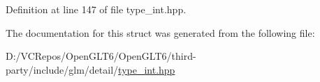 Definition at line 147 of file type\+\_\+int.\+hpp.



The documentation for this struct was generated from the following file\+:\begin{DoxyCompactItemize}
\item 
D\+:/\+V\+C\+Repos/\+Open\+G\+L\+T6/\+Open\+G\+L\+T6/third-\/party/include/glm/detail/\mbox{\hyperlink{type__int_8hpp}{type\+\_\+int.\+hpp}}\end{DoxyCompactItemize}
